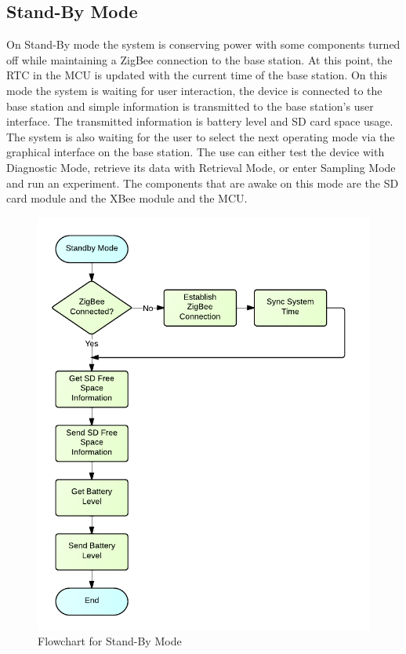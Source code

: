 \subsection{Stand-By Mode}
On Stand-By mode the system is conserving power with some components turned off while maintaining a ZigBee connection to the base station. At this point, the RTC in the MCU is updated with the current time of the base station. On this mode the system is waiting for user interaction, the device is connected to the base station and simple information is transmitted to the base station's user interface. The transmitted information is battery level and SD card space usage. The system is also waiting for the user to select the next operating mode via the graphical interface on the base station. The use can either test the device with Diagnostic Mode, retrieve its data with Retrieval Mode, or enter Sampling Mode and run an experiment. The components that are awake on this mode are the SD card module and the XBee module and the MCU.
\begin{figure}[H]
	\centering
	\includegraphics[scale=1.0]{img/StandByMode}
	\caption{Flowchart for Stand-By Mode \label{fig:standByMode}}
\end{figure}

